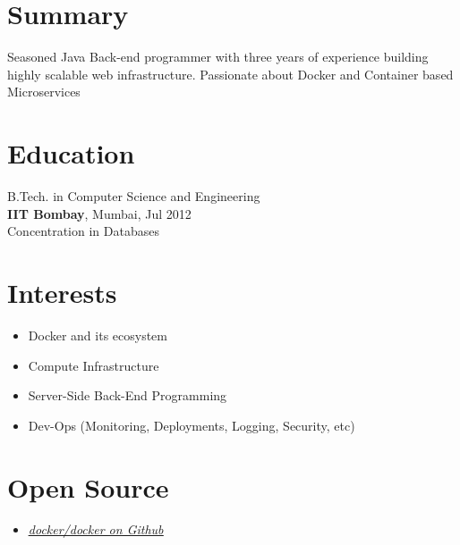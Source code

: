 \documentclass[margin]{res}
\begin{document}

\address{ \textbf{Website}:\href{http://ankush.io/}{ankush.io} \textbf{Github}:\href{https://github.com/ankushagarwal}{ankushagarwal} \textbf{Twitter}:\href{https://twitter.com/ankushio}{@ankushio} \textbf{Email}:\href{mailto:ankush@ankush.io}{ankush@ankush.io} }

\begin{resume}

\section{Summary}
  Seasoned Java Back-end programmer with three years of experience building highly scalable web infrastructure. Passionate about Docker and Container based Microservices

\section{Education}
  B.Tech. in Computer Science and Engineering \\
  {\bf IIT Bombay}, Mumbai, Jul 2012 \\
  Concentration in Databases

\section{Interests}
 \begin{itemize} \itemsep -2pt  %
 \item Docker and its ecosystem
 \item Compute Infrastructure
 \item Server-Side Back-End Programming
 \item Dev-Ops (Monitoring, Deployments, Logging, Security, etc)
 \end{itemize}

\section{Open Source}
 \begin{itemize} \itemsep -2pt  %
 \item \textit{\underline{\href{https://github.com/docker/docker/commits/master?author=ankushagarwal}{docker/docker on Github}}}
 \end{itemize}


\end{resume}
\end{document}
